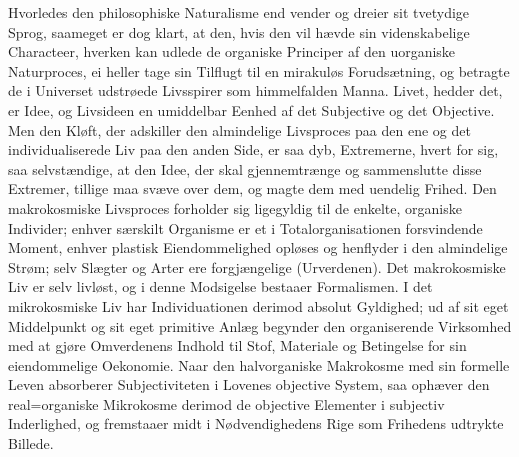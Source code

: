 \documentclass[12pt]{book}
\newcommand{\opage}[1]{\marginnote{\footnotesize\textit{[#1]}}}
\begin{document}
Hvorledes den philosophiske Naturalisme end vender og dreier sit tvetydige Sprog, saameget
er dog klart, at den, hvis den vil hævde sin videnskabelige Characteer, hverken kan udlede
de organiske Principer af den uorganiske Naturproces, ei heller tage sin Tilflugt til en
mirakuløs Forudsætning, og betragte de i Universet udstrøede Livsspirer som himmelfalden
Manna. Livet, hedder det, er Idee, og Livsideen en umiddelbar Eenhed af det Subjective og
det Objective. Men den Kløft, der adskiller den almindelige Livsproces paa den ene og det
individualiserede Liv paa den anden Side, er saa dyb, Extremerne, hvert for sig, saa
selvstændige, at den Idee,
\opage{222} der skal gjennemtrænge og sammenslutte disse Extremer, tillige maa svæve over dem, og magte
dem med uendelig Frihed. Den makrokosmiske Livsproces forholder sig ligegyldig til de
enkelte, organiske Individer; enhver særskilt Organisme er et i Totalorganisationen
forsvindende Moment, enhver plastisk Eiendommelighed opløses og henflyder i den almindelige
Strøm; selv Slægter og Arter ere forgjængelige (Urverdenen). Det makrokosmiske Liv er selv
livløst, og i denne Modsigelse bestaaer Formalismen. I det mikrokosmiske Liv har
Individuationen derimod absolut Gyldighed; ud af sit eget Middelpunkt og sit eget primitive
Anlæg begynder den organiserende Virksomhed med at gjøre Omverdenens Indhold til Stof,
Materiale og Betingelse for sin eiendommelige Oekonomie. Naar den halvorganiske Makrokosme
med sin formelle Leven absorberer Subjectiviteten i Lovenes objective System, saa ophæver
den real=organiske Mikrokosme derimod de objective Elementer i subjectiv Inderlighed, og
fremstaaer midt i Nødvendighedens Rige som Frihedens udtrykte Billede.
\end{document}
